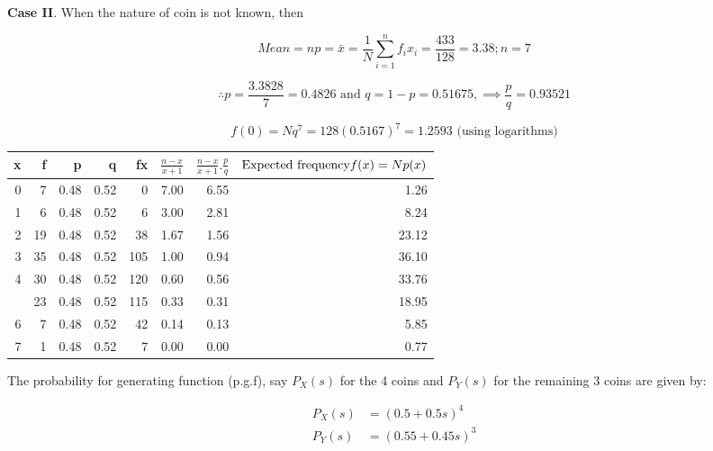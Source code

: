 \documentclass[ignorenonframetext,aspectratio=169]{beamer}
\begin{document}
\begin{frame}{}
\protect\hypertarget{section-31}{}

\small

\textbf{Case II}. When the nature of coin is not known, then

\[
Mean = np = \bar{x} = \frac{1}{N}{\sum}^n_{i = 1}f_ix_i = \frac{433}{128} = 3.38; n = 7
\]

\[
\therefore p = \frac{3.3828}{7} = 0.4826 \text{ and } q = 1-p = 0.51675, \implies \frac{p}{q} = 0.93521
\]

\[
f(0) = Nq^7 = 128 (0.5167)^7 = 1.2593 \text{ (using logarithms)}
\]

\begin{table}[H]
\centering\begingroup\fontsize{6}{8}\selectfont

\begin{tabular}{rrrrrrrr}
\toprule
x & f & p & q & fx & $\frac{n-x}{x+1}$ & $\frac{n-x}{x+1}.\frac{p}{q}$ & $\text{Expected frequency} \newline f(x) = Np(x)$\\
\midrule
0 & 7 & 0.48 & 0.52 & 0 & 7.00 & 6.55 & 1.26\\
1 & 6 & 0.48 & 0.52 & 6 & 3.00 & 2.81 & 8.24\\
2 & 19 & 0.48 & 0.52 & 38 & 1.67 & 1.56 & 23.12\\
3 & 35 & 0.48 & 0.52 & 105 & 1.00 & 0.94 & 36.10\\
4 & 30 & 0.48 & 0.52 & 120 & 0.60 & 0.56 & 33.76\\
\addlinespace
5 & 23 & 0.48 & 0.52 & 115 & 0.33 & 0.31 & 18.95\\
6 & 7 & 0.48 & 0.52 & 42 & 0.14 & 0.13 & 5.85\\
7 & 1 & 0.48 & 0.52 & 7 & 0.00 & 0.00 & 0.77\\
\bottomrule
\end{tabular}
\endgroup{}
\end{table}

\end{frame}

\begin{frame}{}
\protect\hypertarget{section-32}{}

The probability for generating function (p.g.f), say \(P_X(s)\) for the
4 coins and \(P_Y(s)\) for the remaining 3 coins are given by:

\[
\begin{aligned}
P_X(s) &= (0.5 + 0.5 s)^4 \\ 
P_Y(s) &= (0.55 + 0.45 s)^3
\end{aligned}
\]

\end{frame}
\end{document}
